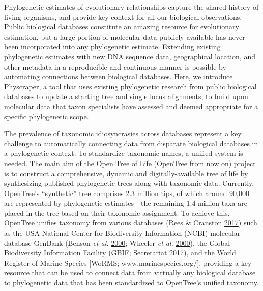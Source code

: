\documentclass[]{article}
\begin{document}
Phylogenetic estimates of evolutionary relationships capture the shared history of living organisms, and provide key context for all our biological observations.
Public biological databases constitute an amazing resource for evolutionary estimation, but a large portion of molecular data publicly available has never been incorporated into any phylogenetic estimate. Extending existing phylogenetic estimates with new DNA sequence data, geographical location, and other metadata in a reproducible and continuous manner is possible by automating connections between biological databases. Here, we introduce Physcraper, a tool that uses existing phylogenetic research from public biological databases to update a starting tree and single locus alignments, to build upon molecular data that taxon specialists have assessed and deemed appropriate for a specific phylogenetic scope.

The prevalence of taxonomic idiosyncrasies across databases represent a key challenge to automatically connecting data from disparate biological databases in a phylogenetic context. To standardize taxonomic names, a unified system is needed. The main aim of the Open Tree of Life (OpenTree from now on) project
is to construct a comprehensive, dynamic and digitally-available tree of life by synthesizing published phylogenetic trees along with taxonomic data. Currently, OpenTree's ``synthetic'' tree comprises 2.3 million tips, of which around 90,000 are represented by phylogenetic estimates - the remaining 1.4 million taxa are placed in the tree based on their taxonomic assignment. To achieve this, OpenTree unifies taxonomy from various databases (Rees \& Cranston \protect\hyperlink{ref-rees2017automated}{2017}) such as the USA National Center for Biodiversity Information (NCBI) molecular database GenBank (Benson \emph{et al.} \protect\hyperlink{ref-benson2000genbank}{2000}; Wheeler \emph{et al.} \protect\hyperlink{ref-wheeler2000database}{2000}), the Global Biodiversity Information Facility (GBIF; Secretariat \protect\hyperlink{ref-secretariat2017gbif}{2017}), and the World Register of Marine Species {[}WoRMS; www.marinespecies.org/{]}, providing a key resource that can be used to connect data from virtually any biological database to phylogenetic data that has been standardized to OpenTree's unified taxonomy.
\end{document}
